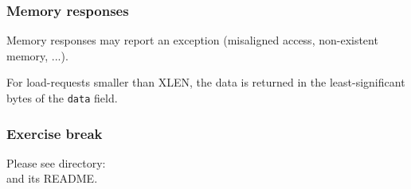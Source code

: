 \begin{frame}[fragile]
\frametitle{Memory responses}

\footnotesize

Memory responses may report an exception (misaligned access, non-existent memory, ...).

\vspace{1ex}



\vspace{4ex}



\vspace{1ex}

For load-requests smaller than XLEN, the data is returned in the
least-significant bytes of the {\tt data} field.

\end{frame}


\begin{frame}
\frametitle{\EmojiExercise \hmm Exercise break}

Please see directory:  \\
and its README.

\end{frame}






